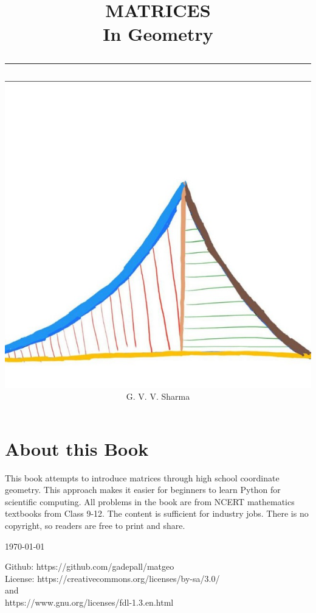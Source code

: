 \documentclass[journal]{IEEEtran}
\begin{document}

\onecolumn


\title{
	\begin{flushleft}
	MATRICES \\ In Geometry
	\\
\rule{0.4\columnwidth}{0.4pt}
\end{flushleft}
}
\author{
\vspace{7cm}
	\begin{flushleft}
\includegraphics[width=0.5\columnwidth]{figs/logo.jpg}
\\
		{	\huge G. V. V. Sharma}
	\end{flushleft}
}
\maketitle

\newpage
\section*{About this Book}

This book attempts to introduce matrices through high school coordinate geometry. This approach makes it easier for beginners to learn Python for scientific computing. All problems in the book are from NCERT mathematics textbooks from Class 9-12.   
The content is sufficient for industry jobs.
There is no copyright, so readers are free to print and share.  
\begin{flushright}
\today
\end{flushright}
Github: https://github.com/gadepall/matgeo
		\\
License: https://creativecommons.org/licenses/by-sa/3.0/
\\
and
\\
https://www.gnu.org/licenses/fdl-1.3.en.html
\end{document}

